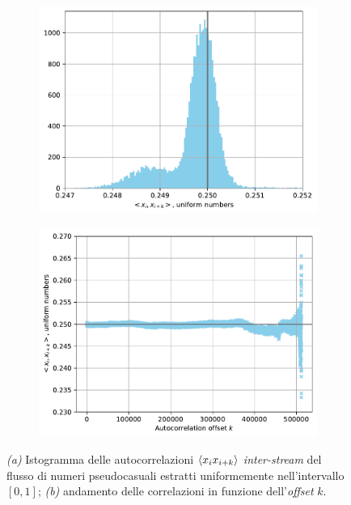 \begin{figure}[t]
\centering
\begin{subfigure}{.5\textwidth}
  \centering
  \includegraphics[scale=0.5]{graphs/CorrelationTests_UniformInterStreamAutocorrelationHistogram.pdf}
  \caption{}
  \label{fig:inter_uni_autocorr_histo}
\end{subfigure}%
\begin{subfigure}{.5\textwidth}
  \centering
  \includegraphics[scale=0.5]{graphs/CorrelationTests_UniformInterStreamAutocorrelationVsOffset.pdf}
  \caption{}
  \label{fig:inter_uni_autocorr_offset}
\end{subfigure}
\caption{\textit{(a)} Istogramma delle autocorrelazioni $\braket{x_i x_{i+k}}$ \textit{inter-stream} del flusso di numeri pseudocasuali estratti uniformemente nell'intervallo $[0,1]$; \textit{(b)} andamento delle correlazioni in funzione dell'\textit{offset} $k$.}
\end{figure}

